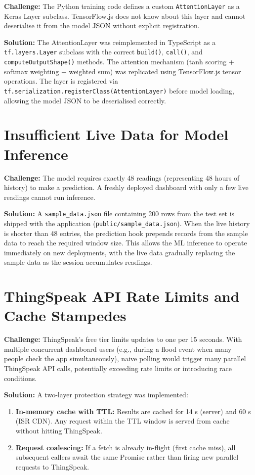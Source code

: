 \textbf{Challenge:} The Python training code defines a custom \texttt{AttentionLayer} as a Keras Layer subclass. TensorFlow.js does not know about this layer and cannot deserialise it from the model JSON without explicit registration.

\textbf{Solution:} The AttentionLayer was reimplemented in TypeScript as a \texttt{tf.\allowbreak{}layers.\allowbreak{}Layer} subclass with the correct \texttt{build()}, \texttt{call()}, and \texttt{computeOutputShape()} methods. The attention mechanism (tanh scoring + softmax weighting + weighted sum) was replicated using TensorFlow.js tensor operations. The layer is registered via \texttt{tf.\allowbreak{}serialization.\allowbreak{}registerClass(AttentionLayer)} before model loading, allowing the model JSON to be deserialised correctly.

\section{Insufficient Live Data for Model Inference}

\textbf{Challenge:} The model requires exactly 48 readings (representing 48 hours of history) to make a prediction. A freshly deployed dashboard with only a few live readings cannot run inference.

\textbf{Solution:} A \texttt{sample\_\allowbreak{}data.\allowbreak{}json} file containing 200 rows from the test set is shipped with the application (\texttt{public/\allowbreak{}sample\_\allowbreak{}data.\allowbreak{}json}). When the live history is shorter than 48 entries, the prediction hook prepends records from the sample data to reach the required window size. This allows the ML inference to operate immediately on new deployments, with the live data gradually replacing the sample data as the session accumulates readings.

\section{ThingSpeak API Rate Limits and Cache Stampedes}

\textbf{Challenge:} ThingSpeak's free tier limits updates to one per 15 seconds. With multiple concurrent dashboard users (e.g., during a flood event when many people check the app simultaneously), naive polling would trigger many parallel ThingSpeak API calls, potentially exceeding rate limits or introducing race conditions.

\textbf{Solution:} A two-layer protection strategy was implemented:
\begin{enumerate}[leftmargin=1.5em]
  \item \textbf{In-memory cache with TTL:} Results are cached for 14 s (server) and 60 s (ISR CDN). Any request within the TTL window is served from cache without hitting ThingSpeak.
  \item \textbf{Request coalescing:} If a fetch is already in-flight (first cache miss), all subsequent callers await the same Promise rather than firing new parallel requests to ThingSpeak.
\end{enumerate}

